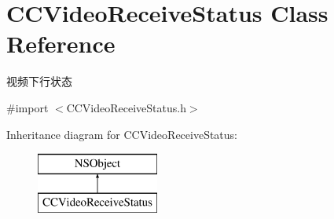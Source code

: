 \hypertarget{interface_c_c_video_receive_status}{}\section{C\+C\+Video\+Receive\+Status Class Reference}
\label{interface_c_c_video_receive_status}


视频下行状态  




{\ttfamily \#import $<$C\+C\+Video\+Receive\+Status.\+h$>$}

Inheritance diagram for C\+C\+Video\+Receive\+Status\+:\begin{figure}[H]
\begin{center}
\leavevmode
\includegraphics[height=2.000000cm]{interface_c_c_video_receive_status}
\end{center}
\end{figure}
